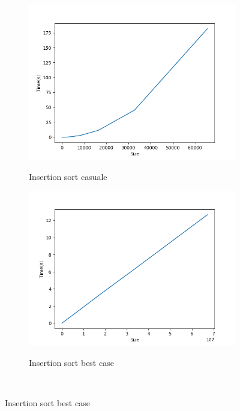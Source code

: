 \documentclass[]{article}
\begin{document}
\begin{figure}[H]
    \centering
    \begin{subfigure}[b]{0.4\linewidth} 
        \centering
        \caption{Insertion sort casuale}
        \includegraphics[width=\textwidth]{InsertionSortCasuale}
        \label{fig:insertion_casuale}
    \end{subfigure}
    \quad
    \begin{subfigure}[b]{0.4\linewidth}
        \centering
        \caption{Insertion sort best case}
        \includegraphics[width=\textwidth]{InsertionSortBestCase}
        \label{fig:insertion_best}
    \end{subfigure}
    \\

\end{figure}
\end{document}
